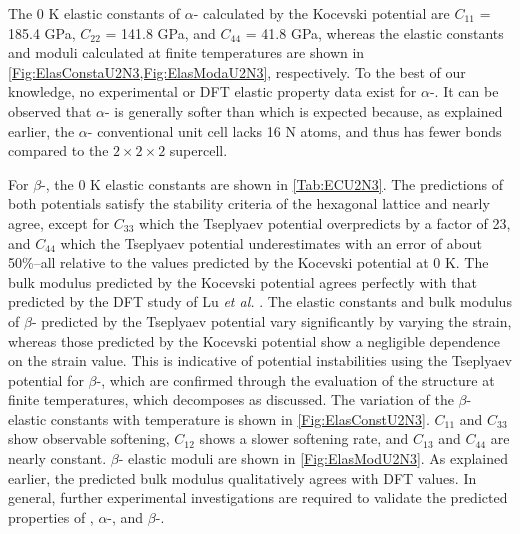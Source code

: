 \documentclass[preprint, 12pt]{elsarticle}
\begin{document}
The 0 K elastic constants of $\alpha$- calculated by the Kocevski potential are $C_{11}$ = 185.4 GPa, $C_{22}$ = 141.8 GPa, and $C_{44}$ = 41.8 GPa, whereas the elastic constants and moduli calculated at finite temperatures are shown in \cref{Fig:ElasConstaU2N3,Fig:ElasModaU2N3}, respectively. To the best of our knowledge, no experimental or DFT elastic property data exist for $\alpha$-. It can be observed that $\alpha$- is generally softer than  which is expected because, as explained earlier, the $\alpha$- conventional unit cell lacks 16 N atoms, and thus has fewer bonds compared to the $2 \times 2 \times 2$  supercell.

For $\beta$-, the 0 K elastic constants are shown in \cref{Tab:ECU2N3}. The predictions of both potentials satisfy the stability criteria of the hexagonal lattice and nearly agree, except for $C_{33}$ which the Tseplyaev potential overpredicts by a factor of 23, and $C_{44}$ which the Tseplyaev potential underestimates with an error of about 50\%--all relative to the values predicted by the Kocevski potential at 0 K. The bulk modulus predicted by the Kocevski potential agrees perfectly with that predicted by the DFT study of Lu \textit{et al.} \cite{Lu2011}. The elastic constants and bulk modulus of $\beta$- predicted by the Tseplyaev potential vary significantly by varying the strain, whereas those predicted by the Kocevski potential show a negligible dependence on the strain value. This is indicative of potential instabilities using the Tseplyaev potential for $\beta$-, which are confirmed through the evaluation of the structure at finite temperatures, which decomposes as discussed. The variation of the $\beta$- elastic constants with temperature is shown in \cref{Fig:ElasConstU2N3}. $C_{11}$ and $C_{33}$ show observable softening, $C_{12}$ shows a slower softening rate, and $C_{13}$ and $C_{44}$ are nearly constant. $\beta$- elastic moduli are shown in \cref{Fig:ElasModU2N3}. As explained earlier, the predicted bulk modulus qualitatively agrees with DFT values. In general, further experimental investigations are required to validate the predicted properties of , $\alpha$-, and $\beta$-.
\end{document}
